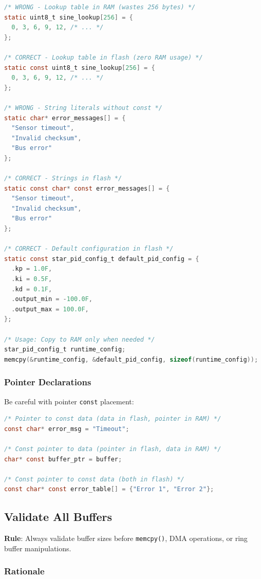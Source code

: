 \begin{lstlisting}[language=C]
/* WRONG - Lookup table in RAM (wastes 256 bytes) */
static uint8_t sine_lookup[256] = {
  0, 3, 6, 9, 12, /* ... */
};

/* CORRECT - Lookup table in flash (zero RAM usage) */
static const uint8_t sine_lookup[256] = {
  0, 3, 6, 9, 12, /* ... */
};

/* WRONG - String literals without const */
static char* error_messages[] = {
  "Sensor timeout",
  "Invalid checksum",
  "Bus error"
};

/* CORRECT - Strings in flash */
static const char* const error_messages[] = {
  "Sensor timeout",
  "Invalid checksum",
  "Bus error"
};

/* CORRECT - Default configuration in flash */
static const star_pid_config_t default_pid_config = {
  .kp = 1.0F,
  .ki = 0.5F,
  .kd = 0.1F,
  .output_min = -100.0F,
  .output_max = 100.0F,
};

/* Usage: Copy to RAM only when needed */
star_pid_config_t runtime_config;
memcpy(&runtime_config, &default_pid_config, sizeof(runtime_config));


\end{lstlisting}
\subsubsection{Pointer Declarations}

Be careful with pointer \texttt{const} placement:

\begin{lstlisting}[language=C]
/* Pointer to const data (data in flash, pointer in RAM) */
const char* error_msg = "Timeout";

/* Const pointer to data (pointer in flash, data in RAM) */
char* const buffer_ptr = buffer;

/* Const pointer to const data (both in flash) */
const char* const error_table[] = {"Error 1", "Error 2"};


\end{lstlisting}
\subsection{Validate All Buffers}

\textbf{Rule}: Always validate buffer sizes before \texttt{memcpy()}, DMA operations, or ring buffer manipulations.

\subsubsection{Rationale}

